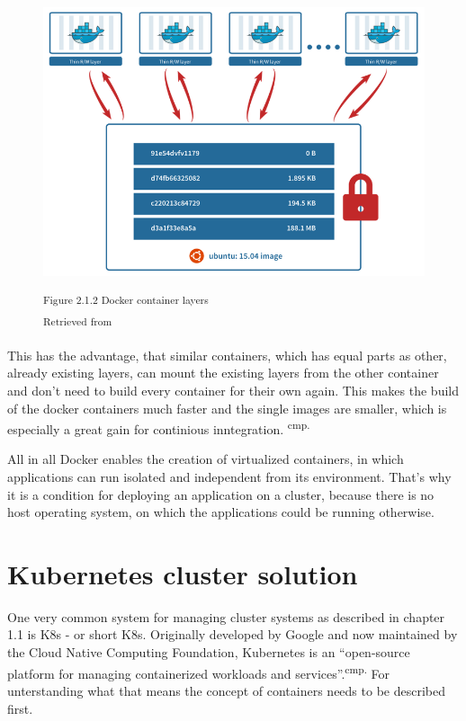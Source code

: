 \begin{figure}[h]
\centering
\includegraphics[width=\textwidth/5*3]{images/docker_layer.png}

\textsuperscript{Figure 2.1.2 Docker container layers}\\
\textsuperscript{Retrieved from \cite{16}}
\end{figure}

This has the advantage, that similar containers, which has equal parts as other, already existing layers, can mount the existing layers from the other container and don't need to build every container for their own again. This makes the build of the docker containers much faster and the single images are smaller, which is especially a great gain for continious inntegration. \textsuperscript{cmp.\cite{17}}


All in all Docker enables the creation of virtualized containers, in which applications can run isolated and independent from its environment. That's why it is a condition for deploying an application on a cluster, because there is no host operating system, on which the applications could be running otherwise.


\section{Kubernetes cluster solution}

One very common system for managing cluster systems as described in chapter 1.1 is \acl{K8s} - or short \acs{K8s}. Originally developed by Google and now maintained by the Cloud Native Computing Foundation, Kubernetes is an ``open-source platform for managing containerized workloads and services''.\textsuperscript{cmp.\cite{18}} For unterstanding what that means the concept of containers needs to be described first.

